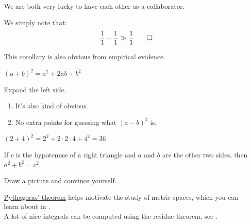\documentclass[10pt]{extarticle}
\makeatletter
\newcommand{\<}{\langle}
\renewcommand{\>}{\rangle}
\renewenvironment{proof}[1][\proofname] {\par\pushQED{\qed}{\normalfont\sffamily\bfseries\topsep6\p@\@plus6\p@\relax #1\@addpunct{.} }}{\popQED\endtrivlist\@endpefalse}
\theoremstyle{mystyle}{\newtheorem{definition}{Definition}[section]}
\theoremstyle{mystyle}{\newtheorem{proposition}[definition]{Proposition}}
\theoremstyle{mystyle}{\newtheorem{theorem}[definition]{Theorem}}
\theoremstyle{mystyle}{\newtheorem{lemma}[definition]{Lemma}}
\theoremstyle{mystyle}{\newtheorem{corollary}[definition]{Corollary}}
\theoremstyle{mystyle}{\newtheorem*{remark}{Remark}}
\theoremstyle{mystyle}{\newtheorem*{remarks}{Remarks}}
\theoremstyle{mystyle}{\newtheorem*{example}{Example}}
\theoremstyle{mystyle}{\newtheorem*{examples}{Examples}}
\theoremstyle{definition}{\newtheorem*{exercise}{Exercise}}
\theoremstyle{cstyle}{\newtheorem*{cthm}{}}
\theoremstyle{warn}
\makeatother
\begin{document}
\begin{corollary}
We are both very lucky to have each other as a collaborator.
\end{corollary}
\begin{proof}
We simply note that:
\begin{equation*}
    \frac{1}{1}+\frac{1}{1}\gg\frac{1}{1} \qedhere
\end{equation*}
\end{proof}
\begin{remark}
This corollary is also obvious from empirical evidence.
\end{remark}

\begin{lemma}
$(a+b)^2=a^2+2ab+b^2$
\end{lemma}
\begin{proof}
Expand the left side.
\end{proof}
\begin{remarks}\leavevmode
\begin{enumerate}
    \item It's also kind of obvious.
    \item No extra points for guessing what $(a-b)^2$ is.
\end{enumerate}
\end{remarks}

\begin{example}
$(2+4)^2=2^2+2\cdot 2\cdot 4+4^2=36$
\end{example}

\begin{theorem}\label{pythagoras}
If $c$ is the hypotenuse of a right triangle and $a$ and $b$ are the other two sides, then $a^2+b^2=c^2$.
\end{theorem}
\begin{proof}
Draw a picture and convince yourself.
\end{proof}

\hyperref[pythagoras]{Pythagoras' theorem} helps motivate the study of metric spaces, which you can learn about in \cite{sekhon}.\\

A lot of nice integrals can be computed using the residue theorem, see \cite[Section 5.2]{taylor}.


\newpage
\appendix
\end{document}
